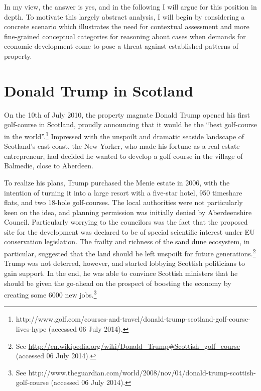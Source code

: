 \documentclass[12pt,a4paper]{book} %
\begin{document}
In my view, the answer is yes, and in the following I will argue for this position in depth. To motivate this largely abstract analysis, I will begin by considering a concrete scenario which illustrates the need for contextual assessment and more fine-grained conceptual categories for reasoning about cases when demands for economic development come to pose a threat against established patterns of property.

\section{Donald Trump in Scotland}\label{sec:dts}

On the 10th of July 2010, the property magnate Donald Trump opened his first golf-course in Scotland, proudly announcing that it would be the ``best golf-course in the world''.\footnote{http://www.golf.com/courses-and-travel/donald-trump-scotland-golf-course-lives-hype (accessed 06 July 2014).} Impressed with the unspoilt and dramatic seaside landscape of Scotland's east coast, the New Yorker, who made his fortune as a real estate entrepreneur, had decided he wanted to develop a golf course in the village of Balmedie, close to Aberdeen.

To realize his plans, Trump purchased the Menie estate in 2006, with the intention of turning it into a large resort with a five-star hotel, 950 timeshare flats, and two 18-hole golf-courses. The local authorities were not particularly keen on the idea, and planning permission was initially denied by Aberdeenshire Council. Particularly worrying to the councilors was the fact that the proposed site for the development was declared to be of special scientific interest under EU conservation legislation. The frailty and richness of the sand dune ecosystem, in particular, suggested that the land should be left unspoilt for future generations.\footnote{See \url{http://en.wikipedia.org/wiki/Donald_Trump#Scottish_golf_course} (accessed 06 July 2014).} Trump was not deterred, however, and started lobbying Scottish politicians to gain support. In the end, he was able to convince Scottish ministers that he should be given the go-ahead on the prospect of boosting the economy by creating some 6000 new jobs.\footnote{See http://www.theguardian.com/world/2008/nov/04/donald-trump-scottish-golf-course (accessed 06 July 2014).}
\end{document}
